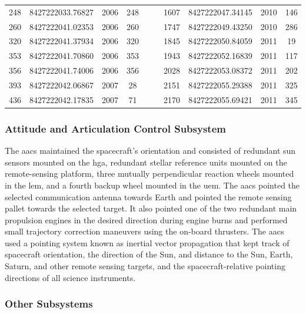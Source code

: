 \documentclass[oneside]{book}
\theoremstyle{mystyle}
\begin{document}
\begin{table}[H]
\begin{tabular}{|c c c c c | c c c c c|}
         248    & 8427222033.76827  & 2006  & 248 & & & 1607 & 8427222047.34145 & 2010 & 146 \\
         260    & 8427222041.02353  & 2006  & 260 & & & 1747 & 8427222049.43250 & 2010 & 286 \\
         320    & 8427222041.37934  & 2006  & 320 & & & 1845 & 8427222050.84059 & 2011 &  19 \\
         353    & 8427222041.70860  & 2006  & 353 & & & 1943 & 8427222052.16839 & 2011 & 117 \\
         356    & 8427222041.74006  & 2006  & 356 & & & 2028 & 8427222053.08372 & 2011 & 202 \\
         393    & 8427222042.06867  & 2007  &  28 & & & 2151 & 8427222055.29388 & 2011 & 325 \\
         436    & 8427222042.17835  & 2007  &  71 & & & 2170 & 8427222055.69421 & 2011 & 345 \\
         \hline
    \end{tabular}
\end{table}

\subsubsection{\footnotesize Attitude and Articulation Control Subsystem \label{subsubsec:usr_att_and_art_cont_subsye}}

The \gls{aacs} maintained the spacecraft's orientation and consisted of redundant sun sensors mounted on the \gls{hga}, redundant stellar reference units mounted on the remote-sensing platform, three mutually perpendicular reaction wheels mounted in the \gls{lem}, and a fourth backup wheel mounted in the \gls{uem}. The \gls{aacs} pointed the selected communication antenna towards Earth and pointed the remote sensing pallet towards the selected target. It also pointed one of the two redundant main propulsion engines in the desired direction during engine burns and performed small trajectory correction maneuvers using the on-board thrusters. The \gls{aacs} used a pointing system known as \gls{inertial vector propagation} that kept track of spacecraft orientation, the direction of the Sun, and distance to the Sun, Earth, Saturn, and other remote sensing targets, and the spacecraft-relative pointing directions of all science instruments. 

\subsubsection{\footnotesize Other Subsystems \label{subsubsec:usr_other_subsys}}
\end{document}
